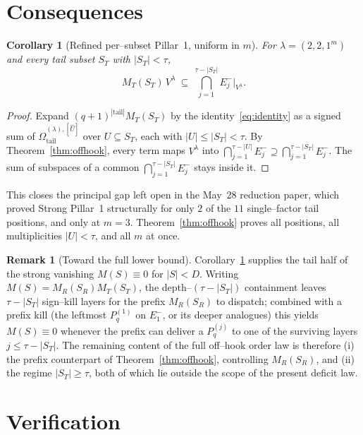 \documentclass[11pt]{article}
\newtheorem{corollary}[theorem]{Corollary}
\theoremstyle{definition}
\newtheorem{remark}[theorem]{Remark}
\newcommand{\Vlam}{V^\lambda}
\newcommand{\Em}[1]{E^{-}_{#1}}
\newcommand{\OmU}{\Omega^{(\lambda),[\widehat U]}_{\mathrm{tail}}}
\newcommand{\Pq}{P_{q}}
\begin{document}
\section{Consequences}\label{sec:consequences}

\begin{corollary}[Refined per--subset Pillar~1, uniform in $m$]\label{cor:persubset}
For $\lambda=(2,2,1^m)$ and every tail subset $S_T$ with $|S_T|<\tau$,
\[
   M_T(S_T)\,\Vlam\ \subseteq\ \bigcap_{j=1}^{\tau-|S_T|}\Em j\big|_{\Vlam}.
\]
\end{corollary}

\begin{proof}
Expand $(q+1)^{|\mathrm{tail}|}M_T(S_T)$ by the identity~\eqref{eq:identity} as a signed sum
of $\OmU{}$ over $U\subseteq S_T$, each with $|U|\le|S_T|<\tau$. By
Theorem~\ref{thm:offhook}, every term maps $\Vlam$ into
$\bigcap_{j=1}^{\tau-|U|}\Em j\supseteq\bigcap_{j=1}^{\tau-|S_T|}\Em j$. The sum of subspaces
of a common $\bigcap_{j=1}^{\tau-|S_T|}\Em j$ stays inside it.
\end{proof}

This closes the principal gap left open in the May~28 reduction paper, which proved Strong
Pillar~1 structurally for only $2$ of the $11$ single--factor tail positions, and only at
$m=3$. Theorem~\ref{thm:offhook} proves all positions, all multiplicities $|U|<\tau$, and
all $m$ at once.

\begin{remark}[Toward the full lower bound]
Corollary~\ref{cor:persubset} supplies the tail half of the strong vanishing
$M(S)\equiv0$ for $|S|<D$. Writing $M(S)=M_R(S_R)M_T(S_T)$, the depth--$(\tau-|S_T|)$
containment leaves $\tau-|S_T|$ sign--kill layers for the prefix $M_R(S_R)$ to dispatch;
combined with a prefix kill (the leftmost $\Pq^{(1)}$ on $\Em1$, or its deeper analogues)
this yields $M(S)\equiv0$ whenever the prefix can deliver a $\Pq^{(j)}$ to one of the
surviving layers $j\le\tau-|S_T|$. The remaining content of the full off--hook order law
is therefore (i) the prefix counterpart of Theorem~\ref{thm:offhook}, controlling
$M_R(S_R)$, and (ii) the regime $|S_T|\ge\tau$, both of which lie outside the scope of the
present deficit law.
\end{remark}

\section{Verification}\label{sec:verify}
\end{document}
